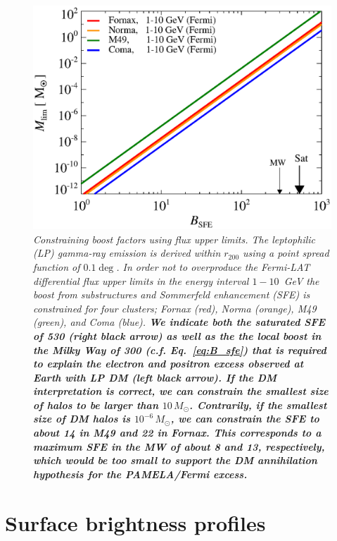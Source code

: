 \documentclass[10pt,aps,pra,reprint,amsmath,amsfonts,amssymb,showpacs,nofootinbib,floatfix]{revtex4-1}
\def\C#1{{\bf #1}}
\newcommand{\Fermi}{{\em Fermi}\xspace}
\newcommand{\msun}{M_\odot}
\newcommand{\rvir}{r_{200}}
\begin{document}
\begin{figure}%
 \includegraphics[width=0.99\columnwidth]{figures/LP.const.diff.v13.0.1deg.1.6T.SubMass.SF700.IR2.noMW.woGal.eps}
 \caption{\it Constraining boost factors using flux upper limits. The
   leptophilic (LP) gamma-ray emission is derived within $\rvir$ using
   a point spread function of $0.1\deg$. In order not to overproduce
   the \Fermi-LAT differential flux upper limits in the energy interval
   $1-10$~GeV the boost from substructures and Sommerfeld enhancement
   (SFE) is constrained for four clusters; Fornax (red), Norma
   (orange), M49 (green), and Coma (blue). \C{We indicate both the
     saturated SFE of 530 (right black arrow) as well as the the local
     boost in the Milky Way of 300 (c.f. Eq.~\ref{eq:B_sfe}) that is
     required to explain the electron and positron excess observed at
     Earth with LP DM (left black arrow). If the DM interpretation is
     correct, we can constrain the smallest size of halos to be larger
     than $10\,\msun$. Contrarily, if the smallest size of DM halos is
     $10^{-6}\,\msun$, we can constrain the SFE to about 14 in M49 and
     22 in Fornax. This corresponds to a maximum SFE in the MW of
     about 8 and 13, respectively, which would be too small to support
     the DM annihilation hypothesis for the PAMELA/\Fermi excess.}}
 \label{fig:boost_const}
\end{figure}


\section{Surface brightness profiles}
\label{sect:spatial}
\end{document}
